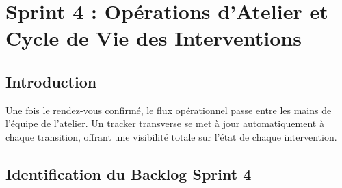 \chapter{Sprint 4 : Opérations d'Atelier et Cycle de Vie des Interventions}


\section{Introduction}

Une fois le rendez-vous confirmé, le flux opérationnel passe entre les mains de
l'équipe de l'atelier. Un tracker transverse se met à jour automatiquement à chaque
transition, offrant une visibilité totale sur l'état de chaque intervention.

\section{Identification du Backlog Sprint 4}

